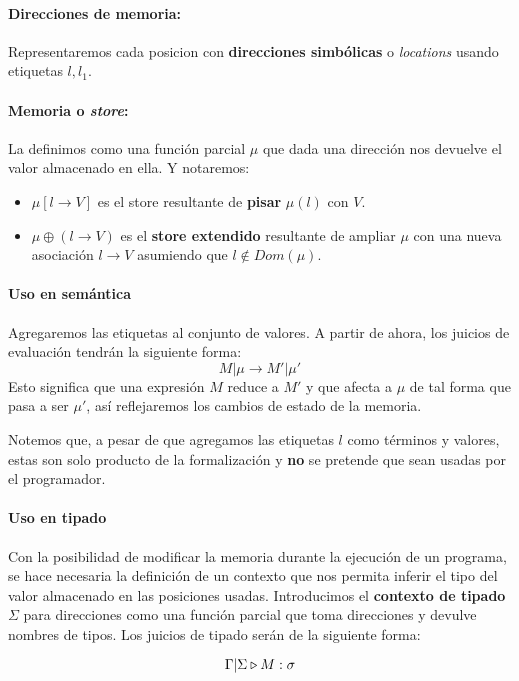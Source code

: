 \paragraph{Direcciones de memoria:} Representaremos cada posicion con \textbf{direcciones simbólicas} o \textit{locations} usando etiquetas $l,l_1$.

\paragraph{Memoria o \textit{store}:} La definimos como una función parcial $\mu$ que dada una dirección nos devuelve el valor almacenado en ella. Y notaremos:
\begin{itemize}
	\item $\mu[l\to V]$ es el store resultante de \textbf{pisar} $\mu(l)$ con $V$.
	\item $\mu\oplus(l\to V)$ es el \textbf{store extendido} resultante de ampliar $\mu$ con una nueva asociación $l \to V$ asumiendo que $l \notin Dom(\mu)$.    
\end{itemize}

\paragraph{Uso en semántica} Agregaremos las etiquetas al conjunto de valores. A partir de ahora, los juicios de evaluación tendrán la siguiente forma: 
$$M|\mu \to M'|\mu'$$
Esto significa que una expresión $M$ reduce a $M'$ y que afecta a $\mu$ de tal forma que pasa a ser $\mu'$, así reflejaremos los cambios de estado de la memoria.

Notemos que, a pesar de que agregamos las etiquetas $l$ como términos y valores, estas son solo producto de la formalización y \textbf{no} se pretende que sean usadas por el programador.

\paragraph{Uso en tipado} Con la posibilidad de modificar la memoria durante la ejecución de un programa, se hace necesaria la definición de un contexto que nos permita inferir el tipo del valor almacenado en las posiciones usadas. Introducimos el \textbf{contexto de tipado} $\Sigma$ para direcciones como una función parcial que toma direcciones y devulve nombres de tipos. Los juicios de tipado serán de la siguiente forma:

$$\Gamma|\Sigma\triangleright M : \sigma$$

